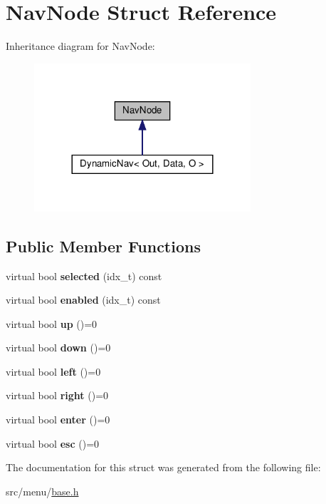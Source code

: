 \hypertarget{structNavNode}{}\section{Nav\+Node Struct Reference}
\label{structNavNode}


Inheritance diagram for Nav\+Node\+:\nopagebreak
\begin{figure}[H]
\begin{center}
\leavevmode
\includegraphics[width=228pt]{structNavNode__inherit__graph}
\end{center}
\end{figure}
\subsection*{Public Member Functions}
\begin{DoxyCompactItemize}
\item 
\mbox{\label{structNavNode_acfd2cf12d4252148f39f2281923207fd}} 
virtual bool {\bfseries selected} (idx\+\_\+t) const
\item 
\mbox{\label{structNavNode_a9865c81d79b6afb724bf2305745af4a8}} 
virtual bool {\bfseries enabled} (idx\+\_\+t) const
\item 
\mbox{\label{structNavNode_a8ea0902eb8294a29b7128b7097ef5a6c}} 
virtual bool {\bfseries up} ()=0
\item 
\mbox{\label{structNavNode_ab8aa8f5aea781ceb42fb107211c23eac}} 
virtual bool {\bfseries down} ()=0
\item 
\mbox{\label{structNavNode_a70c467220fab7c4648d6fd72213109c7}} 
virtual bool {\bfseries left} ()=0
\item 
\mbox{\label{structNavNode_ad11086e7f82681cb6c47671021bfd5bc}} 
virtual bool {\bfseries right} ()=0
\item 
\mbox{\label{structNavNode_ad76a28bf039c7ca36fc9343a9689cb0d}} 
virtual bool {\bfseries enter} ()=0
\item 
\mbox{\label{structNavNode_a24fba244d14fde32cdaf81b277444ea7}} 
virtual bool {\bfseries esc} ()=0
\end{DoxyCompactItemize}


The documentation for this struct was generated from the following file\+:\begin{DoxyCompactItemize}
\item 
src/menu/\hyperlink{base_8h}{base.\+h}\end{DoxyCompactItemize}
